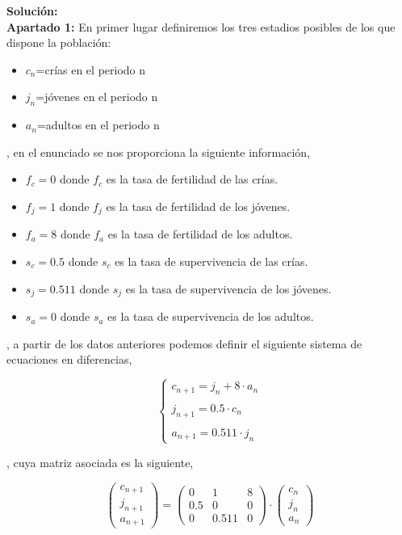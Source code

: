 \documentclass{article}
\begin{document}
\textbf{Solución:} \\
\textbf{Apartado 1:}
En primer lugar definiremos los tres estadios posibles de los que dispone la población:

\begin{itemize}
\item $c_n$=crías en el periodo n
\item $j_n$=jóvenes en el periodo n
\item $a_n$=adultos en el periodo n
\end{itemize}

, en el enunciado se nos proporciona la siguiente información,

\begin{itemize}
\item $f_c = 0$ donde $f_c$ es la tasa de fertilidad de las crías.
\item $f_j = 1$ donde $f_j$ es la tasa de fertilidad de los jóvenes.
\item $f_a = 8$ donde $f_a$ es la tasa de fertilidad de los adultos.
\item $s_c = 0.5$ donde $s_c$ es la tasa de supervivencia de las crías.
\item $s_j = 0.511$ donde $s_j$ es la tasa de supervivencia de los jóvenes.
\item $s_a = 0$ donde $s_a$ es la tasa de supervivencia de los adultos.
\end{itemize}

, a partir de los datos anteriores podemos definir el siguiente sistema de ecuaciones en diferencias,

\begin{equation*}
\left\{ \begin{array}{lcc}
             c_{n+1} = j_n + 8\cdot a_n \\
             \\ j_{n+1} = 0.5\cdot c_n \\
             \\ a_{n+1} = 0.511\cdot j_n
             \end{array}
   \right.
\end{equation*}

, cuya matriz asociada es la siguiente,

\begin{equation}
\begin{pmatrix}
c_{n+1} \\
j_{n+1} \\
a_{n+1}
\end{pmatrix} 
=
\begin{pmatrix}
0 & 1 & 8 \\
0.5 & 0 & 0 \\
0 & 0.511 & 0
\end{pmatrix}
\cdot
\begin{pmatrix}
c_n \\
j_n \\
a_n 
\end{pmatrix}
\end{equation}
\end{document}
